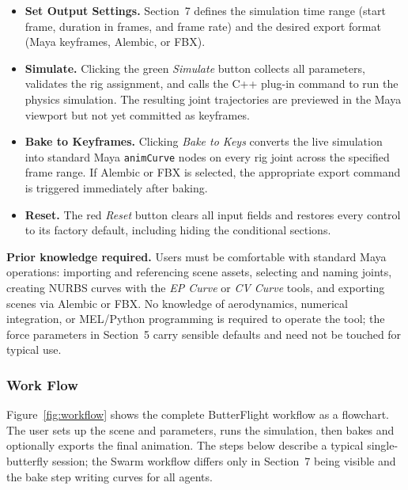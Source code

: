 \documentclass[12pt]{article}
\begin{document}
\begin{itemize}
  \item \textbf{Set Output Settings.} Section~7 defines the simulation time range (start
    frame, duration in frames, and frame rate) and the desired export format (Maya
    keyframes, Alembic, or FBX).

  \item \textbf{Simulate.} Clicking the green \textit{Simulate} button collects all
    parameters, validates the rig assignment, and calls the C++ plug-in command to run
    the physics simulation. The resulting joint trajectories are previewed in the Maya
    viewport but not yet committed as keyframes.

  \item \textbf{Bake to Keyframes.} Clicking \textit{Bake to Keys} converts the live
    simulation into standard Maya \texttt{animCurve} nodes on every rig joint across
    the specified frame range. If Alembic or FBX is selected, the appropriate export
    command is triggered immediately after baking.

  \item \textbf{Reset.} The red \textit{Reset} button clears all input fields and
    restores every control to its factory default, including hiding the conditional
    sections.
\end{itemize}

\textbf{Prior knowledge required.} Users must be comfortable with standard Maya
operations: importing and referencing scene assets, selecting and naming joints,
creating NURBS curves with the \textit{EP Curve} or \textit{CV Curve} tools, and
exporting scenes via Alembic or FBX. No knowledge of aerodynamics, numerical integration,
or MEL/Python programming is required to operate the tool; the force parameters in
Section~5 carry sensible defaults and need not be touched for typical use.

\newpage
\subsubsection{Work Flow}

Figure~\ref{fig:workflow} shows the complete ButterFlight workflow as a flowchart.
The user sets up the scene and parameters, runs the simulation, then bakes and
optionally exports the final animation. The steps below describe a typical
single-butterfly session; the Swarm workflow differs only in Section~7 being
visible and the bake step writing curves for all agents.
\end{document}
